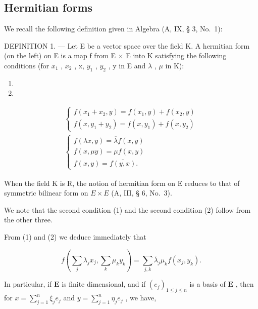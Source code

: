 \subsection{Hermitian forms}

We recall the following definition given in Algebra (A, IX, § 3, No.~1):

DEFINITION 1. --- Let E be a vector space over the field K. A hermitian form (on the left) on E is a map f from E × E into K satisfying the following conditions (for \(x_{1}\) , \(x_{2}\) , x, \(y_{1}\) , \(y_{2}\) , y in E and \(\lambda\) , \(\mu\) in K):

\begin{enumerate}
\def\labelenumi{(\arabic{enumi})}
\tightlist
\item
\item
\end{enumerate}

\[
\begin{array}{c} \left\{ \begin{array}{l} f (x _ {1} + x _ {2}, y) = f (x _ {1}, y) + f (x _ {2}, y) \\ f (x, y _ {1} + y _ {2}) = f (x, y _ {1}) + f (x, y _ {2}) \end{array} \right. \\ \left\{ \begin{array}{l} f (\lambda x, y) = \overline {{\lambda}} f (x, y) \\ f (x, \mu y) = \mu f (x, y) \\ f (x, y) = \overline {{f (y , x)}}  . \end{array} \right. \end{array}\tag{3}
\]

When the field K is R, the notion of hermitian form on E reduces to that of symmetric bilinear form on \(E \times E\) (A, III, § 6, No.~3).

We note that the second condition (1) and the second condition (2) follow from the other three.

From (1) and (2) we deduce immediately that

\[
f \left(\sum_ {j} \lambda_ {j} x _ {j}, \sum_ {k} \mu_ {k} y _ {k}\right) = \sum_ {j, k} \bar {\lambda} _ {j} \mu_ {k} f \left(x _ {j}, y _ {k}\right).\tag{4}
\]

In particular, if \(\mathbf{E}\) is finite dimensional, and if \((e_j)_{1 \leqslant j \leqslant n}\) is a basis of \(\mathbf{E}\) , then for \(x = \sum_{j=1}^{n} \xi_j e_j\) and \(y = \sum_{j=1}^{n} \eta_j e_j\) , we have,

